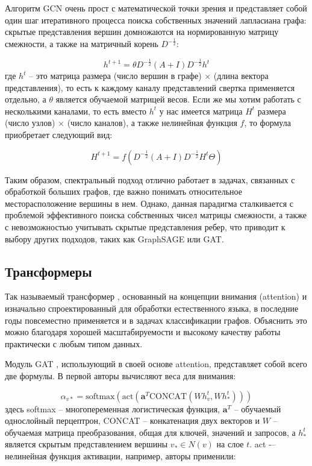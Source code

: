 Алгоритм GCN очень прост с математической точки зрения и представляет собой один шаг итеративного процесса поиска собственных значений лапласиана графа: скрытые представления вершин домножаются на нормированную матрицу смежности, а также на матричный корень \(D^{-\frac{1}{2}}\):

\begin{equation}
    h^{t+1} = \theta D^{-\frac{1}{2}} (A + I) D^{-\frac{1}{2}} h^t
\end{equation}
где \(h^t\) – это матрица размера (число вершин в графе) \(\times\) (длина вектора представления), то есть к каждому каналу представлений свертка применяется отдельно, а \(\theta\) является обучаемой матрицей весов. Если же мы хотим работать с несколькими каналами, то есть вместо \(h^t\) у нас имеется матрица \(H^t\) размера (число узлов) \(\times\) (число каналов), а также нелинейная функция \(f\), то формула приобретает следующий вид:

\begin{equation}
    H^{t+1} = f\left( D^{-\frac{1}{2}} (A + I) D^{-\frac{1}{2}} H^{t} \Theta \right)
\end{equation}

Таким образом, спектральный подход отлично работает в задачах, связанных с обработкой больших графов, где важно понимать относительное месторасположение вершины в нем. Однако, данная парадигма сталкивается с проблемой эффективного поиска собственных чисел матрицы смежности, а также с невозможностью учитывать скрытые представления ребер, что приводит к выбору других подходов, таких как GraphSAGE или GAT.

\pagebreak



\subsection{Трансформеры}

Так называемый трансформер \cite{vaswani2017}, основанный на концепции внимания (attention) и изначально спроектированный для обработки естественного языка, в последние годы повсеместно применяется и в задачах классификации графов. Объяснить это можно благодаря хорошей масштабируемости и высокому качеству работы практически с любым типом данных.

Модуль GAT \cite{velickovic2017}, использующий в своей основе attention, представляет собой всего две формулы. В первой авторы вычисляют веса для внимания:

\begin{equation}
    \alpha_{v \ast} = \text{softmax} \left(\text{act} \left( \mathbf{a}^T \text{CONCAT} (W h_v^t, W h_\ast^t) \right) \right)
\end{equation}
здесь softmax -- многопеременная логистическая функция, \(\mathbf{a}^T\) -- обучаемый однослойный перцептрон, CONCAT -- конкатенация двух векторов и \(W\) -- обучаемая матрица преобразования, общая для ключей, значений и запросов, а \(h_\ast^t\) является скрытым представлением вершины \(v_\ast \in N(v)\) на слое \(t\). act -– нелинейная функция активации, например, авторы применили:

